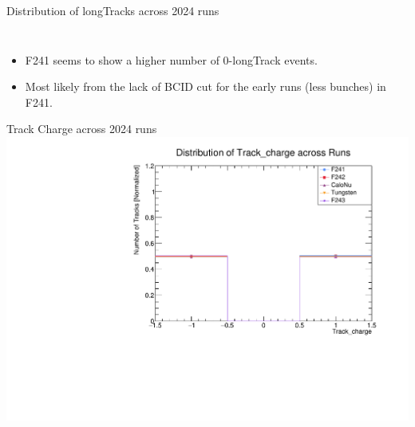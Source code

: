 \begin{frame}{Distribution of longTracks across 2024 runs}
\begin{columns}
\begin{column}{0.55 \linewidth}
\begin{figure}
			\end{figure}
		\end{column}
	\end{columns}
	\begin{itemize}
		\item F241 seems to show a higher number of 0-longTrack events.
		\item Most likely from the lack of BCID cut for the early runs (less bunches) in F241.
	\end{itemize}
\end{frame}

\begin{frame}{Track Charge across 2024 runs}
	\includegraphics[width=\linewidth]{./RunwisePlots/Track_charge_runwise.pdf}
\end{frame}

